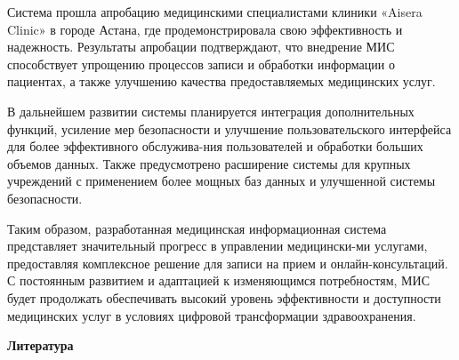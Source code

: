 \begin{multicols}{2}
Система прошла апробацию медицинскими специалистами клиники «Aisera
Clinic» в городе Астана, где продемонстрировала свою эффективность и
надежность. Результаты апробации подтверждают, что внедрение МИС
способствует упрощению процессов записи и обработки информации о
пациентах, а также улучшению качества предоставляемых медицинских услуг.

В дальнейшем развитии системы планируется интеграция дополнительных
функций, усиление мер безопасности и улучшение пользовательского
интерфейса для более эффективного обслужива-ния пользователей и обработки
больших объемов данных. Также предусмотрено расширение системы для
крупных учреждений с применением более мощных баз данных и улучшенной
системы безопасности.

Таким образом, разработанная медицинская информационная система
представляет значительный прогресс в управлении медицински-ми услугами,
предоставляя комплексное решение для записи на прием и
онлайн-консультаций. С постоянным развитием и адаптацией к изменяющимся
потребностям, МИС будет продолжать обеспечивать высокий уровень
эффективности и доступности медицинских услуг в условиях цифровой
трансформации здравоохранения.

\end{multicols}


\begin{center}
  {\bfseries Литература}
  \end{center}

